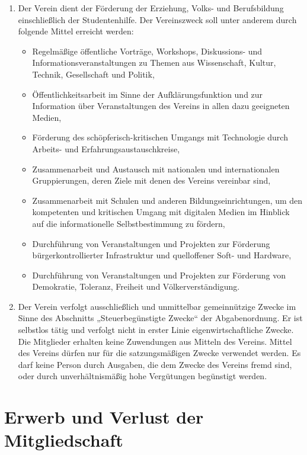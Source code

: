 \documentclass[10pt,a4paper]{scrartcl}
\begin{document}
\begin{enumerate}[label=(\arabic*)]
\item
  Der Verein dient der Förderung der Erziehung, Volks- und Berufsbildung einschließlich
  der Studentenhilfe.
  Der Vereinszweck soll unter anderem durch folgende Mittel erreicht werden:
  \begin{itemize}
  \item
    Regelmäßige öffentliche Vorträge, Workshops, Diskussions- und
    Informationsveranstaltungen zu Themen aus Wissenschaft, Kultur, Technik,
    Gesellschaft und Politik,
  \item
    Öffentlichkeitsarbeit im Sinne der Aufklärungsfunktion und zur Information
    über Veranstaltungen des Vereins in allen dazu geeigneten Medien,
  \item
    Förderung des schöpferisch-kritischen Umgangs mit Technologie durch
    Arbeits- und Erfahrungsaustauschkreise,
  \item
    Zusammenarbeit und Austausch mit nationalen und internationalen
    Gruppierungen, deren Ziele mit denen des Vereins vereinbar sind,
  \item
    Zusammenarbeit mit Schulen und anderen Bildungseinrichtungen, um den
    kompetenten und kritischen Umgang mit digitalen Medien im Hinblick auf die
    informationelle Selbstbestimmung zu fördern,
  \item
    Durchführung von Veranstaltungen und Projekten zur Förderung
    bürgerkontrollierter Infrastruktur und quelloffener Soft- und Hardware,
  \item
    Durchführung von Veranstaltungen und Projekten zur Förderung von
    Demokratie, Toleranz, Freiheit und Völkerverständigung.
  \end{itemize}
\item
  Der Verein verfolgt ausschließlich und unmittelbar gemeinnützige Zwecke im Sinne des
  Abschnitts „Steuerbegünstigte Zwecke“ der Abgabenordnung.
  Er ist selbstlos tätig und verfolgt nicht in erster Linie eigenwirtschaftliche Zwecke.
  Die Mitglieder erhalten keine Zuwendungen aus Mitteln des Vereins.
  Mittel des Vereins dürfen nur für die satzungsmäßigen Zwecke verwendet werden.
  Es darf keine Person durch Ausgaben, die dem Zwecke des Vereins fremd sind, oder
  durch unverhältnismäßig hohe Vergütungen begünstigt werden.
\end{enumerate}


\section{Erwerb und Verlust der Mitgliedschaft}
\end{document}
